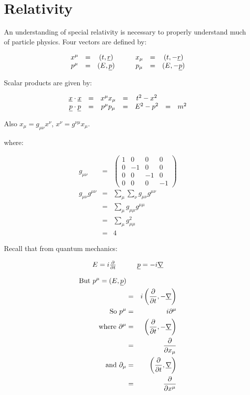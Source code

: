 \chapter{Relativity}

An understanding of special relativity is necessary to properly understand much of particle physics.  Four vectors are defined by:

\[
  \begin{array}{ccccccc}
  x^{\mu} & = & (t,\underline{r}) & \quad & x_{\mu} & = & (t,-\underline{r}) \\
  p^{\mu} & = & (E,\underline{p}) & \quad & p_{\mu} & = & (E,-\underline{p}) 
  \end{array}
\]

Scalar products are given by:

\[
  \begin{array}{ccccccc}
  \underline{x}\cdot\underline{x} & = & x^{\mu}x_{\mu} & = & t^2 - x^2 &   & \\
  \underline{p}\cdot\underline{p} & = & p^{\mu}p_{\mu} & = & E^2 - p^2 & = & m^2
  \end{array}
\]

Also $x_{\mu} = g_{\mu\nu}x^{\nu}$, $x^{\nu} = g^{\nu\mu}x_{\mu}$.

where:

\begin{eqnarray*}
  g_{\mu\nu} & = &
  \left(
    \begin{array}{cccc}
    1 &  0 &  0 & 0 \\
    0 & -1 &  0 & 0 \\
    0 &  0 & -1 & 0 \\
    0 &  0 &  0 & -1
    \end{array}
  \right)
  \\
  g_{\mu\nu}g^{\mu\nu} & = & \displaystyle\sum_{\mu} \displaystyle\sum_{\nu} g_{\mu\nu}g^{\mu\nu} \\
  & = & \displaystyle\sum_{\mu}g_{\mu\mu}g^{\mu\mu} \\
  & = & \displaystyle\sum_{\mu}g_{\mu\mu}^2 \\
  & = & 4
\end{eqnarray*}

Recall that from quantum mechanics:

\[
  \begin{array}{ccc}
  E = i\frac{\partial}{\partial t} & \quad & \underline{p} = -i \underline{\nabla}
  \end{array}
\]

\begin{eqnarray*}
  \textrm{But } p^{\mu} = (E,\underline{p}) \\
  & = & i\left( \frac{\partial}{\partial t},-\underline{\nabla}\right) \\
  \textrm{So } p^{\mu} & = & i\partial^{\mu} \\
  \textrm{where } \partial^{\mu} & = & \left(\frac{\partial}{\partial t},-\underline{\nabla}\right) \\
  & = & \frac{\partial}{\partial x_{\mu}} \\
  \textrm{and } \partial_{\mu} & = & \left( \frac{\partial}{\partial t}, \underline{\nabla}\right) \\
  & = & \frac{\partial}{\partial x^{\mu}}
\end{eqnarray*}

